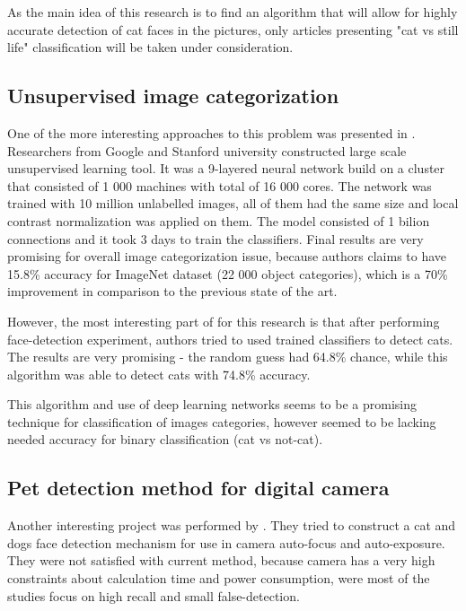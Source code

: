 \documentclass[hyperref]{acmtrans2e}
\begin{document}
As the main idea of this research is to find an algorithm that will allow for highly accurate detection of cat faces in the pictures, only articles presenting "cat vs still life" classification will be taken under consideration.

\subsection{Unsupervised image categorization}


One of the more interesting approaches to this problem was presented in \cite{google:2012}. Researchers from Google and Stanford university constructed large scale unsupervised learning tool. It was a 9-layered neural network build on a cluster that consisted of 1 000 machines with total of 16 000 cores. The network was trained with 10 million unlabelled images, all of them had the same size and local contrast normalization was applied on them. The model consisted of 1 bilion connections and it took 3 days to train the classifiers. Final results are very promising for overall image categorization issue, because authors claims to have 15.8\% accuracy for ImageNet dataset (22 000 object categories), which is a 70\% improvement in comparison to the previous state of the art. 

However, the most interesting part of \cite{google:2012} for this research is that after performing face-detection experiment, authors tried to used trained classifiers to detect cats. The results are very promising - the random guess had 64.8\% chance, while this algorithm was able to detect cats with 74.8\% accuracy.

This algorithm and use of deep learning networks seems to be a promising technique for classification of images categories, however seemed to be lacking needed accuracy for binary classification (cat vs not-cat). 
\subsection{Pet detection method for digital camera}

Another interesting project was performed by \cite{edges:2011}. They tried to construct a cat and dogs face detection mechanism for use in camera auto-focus and auto-exposure. They were not satisfied with current method, because camera has a very high constraints about calculation time and power consumption, were most of the studies focus on high recall and small false-detection. 
\end{document}
